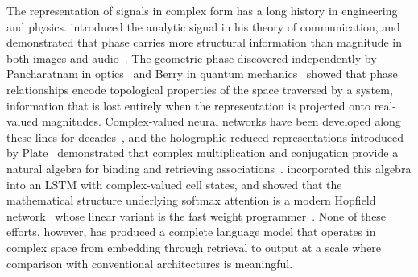 \documentclass[aps,prl,twocolumn,superscriptaddress,amsmath,amssymb]{revtex4-2}
\begin{document}
The representation of signals in complex form has a long history in engineering and physics. \citet{gabor1946theory} introduced the analytic signal in his theory of communication, and \citet{oppenheim1981importance} demonstrated that phase carries more structural information than magnitude in both images and audio~\cite{oppenheim1981importance}. The geometric phase discovered independently by Pancharatnam in optics~\cite{pancharatnam1956generalized} and Berry in quantum mechanics~\cite{berry1984quantal} showed that phase relationships encode topological properties of the space traversed by a system, information that is lost entirely when the representation is projected onto real-valued magnitudes. Complex-valued neural networks have been developed along these lines for decades~\cite{hirose2012complex,arjovsky2016unitary,trabelsi2018deep,wisdom2016full,wolter2018complex}, and the holographic reduced representations introduced by Plate~\cite{plate1995holographic} demonstrated that complex multiplication and conjugation provide a natural algebra for binding and retrieving associations~\cite{gayler2003vector,kleyko2023survey1}. \citet{danihelka2016associative} incorporated this algebra into an LSTM with complex-valued cell states, and \citet{ramsauer2021hopfield} showed that the mathematical structure underlying softmax attention is a modern Hopfield network~\cite{hopfield1982neural,krotov2016dense} whose linear variant is the fast weight programmer~\cite{schmidhuber1992learning,schlag2021linear}. None of these efforts, however, has produced a complete language model that operates in complex space from embedding through retrieval to output at a scale where comparison with conventional architectures is meaningful.
\end{document}
